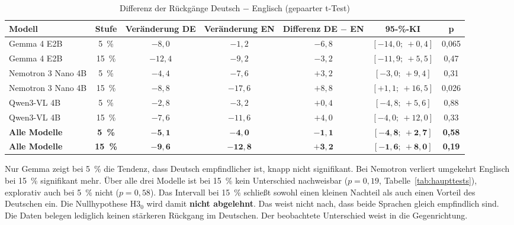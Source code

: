 \documentclass[a4paper,titlepage]{article}
\numberwithin{equation}{section} %
\newcommand{\quelle}[1]{\par\smallskip{\footnotesize Quelle: #1}}
\begin{document}
\begin{table}[htbp]
\centering
\caption{Differenz der Rückgänge Deutsch $-$ Englisch (gepaarter t-Test)}\label{tab:differenz}
\normalsize
{}\renewcommand{\arraystretch}{1.2}
\begin{tabularx}{\textwidth}{@{}p{3.4cm}cCCCcc@{}}
\toprule
\textbf{Modell} & \textbf{Stufe} & \textbf{Verände\-rung DE} & \textbf{Verände\-rung EN} & \textbf{Differenz DE $-$ EN} & \textbf{95-\%-KI} & \textbf{p} \\
\midrule
Gemma 4 E2B        & 5~\%  & $-8{,}0$  & $-1{,}2$  & $-6{,}8$ & $[-14{,}0;\ +0{,}4]$ & 0,065 \\
Gemma 4 E2B        & 15~\% & $-12{,}4$ & $-9{,}2$  & $-3{,}2$ & $[-11{,}9;\ +5{,}5]$ & 0,47 \\
Nemotron 3 Nano 4B & 5~\%  & $-4{,}4$  & $-7{,}6$  & $+3{,}2$ & $[-3{,}0;\ +9{,}4]$  & 0,31 \\
Nemotron 3 Nano 4B & 15~\% & $-8{,}8$  & $-17{,}6$ & $+8{,}8$ & $[+1{,}1;\ +16{,}5]$ & 0,026 \\
Qwen3-VL 4B        & 5~\%  & $-2{,}8$  & $-3{,}2$  & $+0{,}4$ & $[-4{,}8;\ +5{,}6]$  & 0,88 \\
Qwen3-VL 4B        & 15~\% & $-7{,}6$  & $-11{,}6$ & $+4{,}0$ & $[-4{,}0;\ +12{,}0]$ & 0,33 \\
\midrule
\textbf{Alle Modelle} & \textbf{5~\%}  & $\boldsymbol{-5{,}1}$ & $\boldsymbol{-4{,}0}$  & $\boldsymbol{-1{,}1}$ & $\boldsymbol{[-4{,}8;\ +2{,}7]}$ & \textbf{0,58} \\
\textbf{Alle Modelle} & \textbf{15~\%} & $\boldsymbol{-9{,}6}$ & $\boldsymbol{-12{,}8}$ & $\boldsymbol{+3{,}2}$ & $\boldsymbol{[-1{,}6;\ +8{,}0]}$ & \textbf{0,19} \\
\bottomrule
\end{tabularx}
\quelle{eigene Berechnung.}
\end{table}

Nur Gemma zeigt bei 5~\% die Tendenz, dass Deutsch empfindlicher ist, knapp nicht signifikant. Bei Nemotron verliert umgekehrt Englisch bei 15~\% signifikant mehr. Über alle drei Modelle ist bei 15~\% kein Unterschied nachweisbar ($p = 0{,}19$, Tabelle~\ref{tab:haupttests}), explorativ auch bei 5~\% nicht ($p = 0{,}58$). Das Intervall bei 15~\% schließt sowohl einen kleinen Nachteil als auch einen Vorteil des Deutschen ein. Die Nullhypothese H3$_0$ wird damit \textbf{nicht abgelehnt}. Das weist nicht nach, dass beide Sprachen gleich empfindlich sind. Die Daten belegen lediglich keinen stärkeren Rückgang im Deutschen. Der beobachtete Unterschied weist in die Gegenrichtung.
\end{document}
